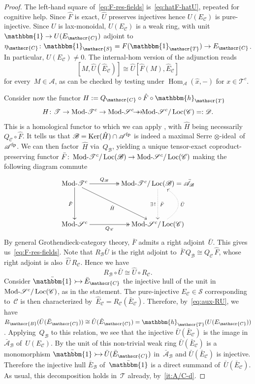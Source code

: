 \documentclass[JEP,XML,SOM,Unicode]{cedram}
\makeatletter
\newcommand{\onto}{\mathchoice{\to\hspace*{-5mm}\to}{\to\hspace*{-2.85mm}\to}{\to\hspace*{-3mm}\to}{\to\hspace*{-3mm}\to}}
\newcommand{\into}{\mathchoice{\xymatrix@=.5cm{\ar@{>->}[r]&}}
{\xymatrix@=.3cm{\ar@{>->}[r]&}\hspace*{-1mm}}
{\hspace*{-1mm}\xymatrix@=.25cm{\ar@{>->}[r]&}\hspace*{-1.5mm}}
{\xymatrix@=.1cm{\ar@{>->}[r]&}\hspace*{-1mm}}
}
\numberwithin{equation}{section}
\theoremstyle{definition}
\DeclareMathOperator{\Hom}{Hom}
\DeclareMathOperator{\Ker}{Ker}
\newcommand{\cat}[1]{\mathscr{#1}}
\newcommand{\Homcat}[1]{\Hom_{\cat #1}}
\newcommand{\unit}{\mathbbm{1}}
\DeclareMathOperator{\Loc}{Loc}
\DeclareMathOperator{\Mod}{Mod}
\newcommand{\AB}{\bar{\cA}_{\cB}}
\newcommand{\bEB}{\bar E_{\cB}}
\newcommand{\bEC}{\bar E_{\cC}}
\newcommand{\bunit}{\bar\unit}
\newcommand{\cA}{\cat{A}}
\newcommand{\cB}{\cat{B}}
\newcommand{\cC}{\cat{C}}
\newcommand{\cD}{\cat{D}}
\newcommand{\cS}{\cat{S}}
\newcommand{\cT}{\cat{T}}
\newcommand{\EC}{E_{\cC}}
\newcommand{\fp}{^{\textup{fp}}}
\newcommand{\hEC}{\hat E_{\cC}}
\newcommand{\Modd}{\Mod\text{\!-}}
\newcommand{\MS}{\Modd\cat S^c}
\newcommand{\MT}{\Modd\cat T^c}
\newcommand{\tensid}{$\otimes$\nobreakdash-ideal}
\newcommand{\yoneda}{\mathbbm{h}}
\makeatother
\begin{document}
\begin{proof}
The left-hand square of~\eqref{eq:F-res-fields} is~\eqref{eq:hatF-hatU}, repeated for cognitive help. Since $\hat F$ is exact, $\hat U$ preserves injectives hence $U(\EC)$ is pure-injective. Since $U$ is lax-monoidal, $U(\EC)$ is a weak ring, with unit~$\unit\to U(\EC)$ adjoint to $\eta_{\cC}\colon \unit_\cS=F(\unit_\cT)\to \EC$. In particular, $U(\EC)\neq 0$. The internal-hom version of the adjunction reads
\begin{equation}
\label{eq:aux-internal-adj}
[M,\hat U(\hEC)]\cong \hat U[\hat F(M),\hEC]
\end{equation}
for every~$M\in\cA$, as can be checked by testing under $\Homcat{A}(\hat x,-)$ for $x\in\cT^c$.

Consider now the functor $H:=Q_{\cC}\circ \hat F\circ\yoneda_\cT$
\[
H\colon \cT\to \MT\to \MS\onto\MS/\Loc(\cC)=:\cD.
\]
This is a homological functor to which we can apply , with $\hat H$ being necessarily~$Q_{\cC}\circ\hat F$. It tells us that $\cB=\Ker(\hat H)\cap\cA\fp$ is indeed a maximal Serre \tensid\ of~$\cA\fp$. We can then factor~$\hat H$ via~$Q_\cB$, yielding a unique tensor-exact coproduct-preserving functor $\bar F\colon \MT/\Loc(\cB)\to \MS/\Loc(\cC)$ making the following diagram commute
\[
\xymatrix@=1.5cm{
\MT \ar[d]_-{\hat F} \ar@{->>}[r]^-{Q_{\cB}} \ar[rd]_-{\hat H}
& \MT/\Loc(\cB)=\AB \ar@{..>}[d]^-{\bar F}_-{\exists\,!}
\\
\MS \ar@{->>}[r]_-{Q_{\cC}}
& \MS/\Loc(\cC) \ar@{..>}@/_3em/[u]_-{\bar U}
}
\]
By general Grothendieck-category theory, $\bar F$ admits a right adjoint~$\bar U$. This gives us~\eqref{eq:F-res-fields}. Note that $R_{\cB}\bar U$ is the right adjoint to~$\bar F\,Q_{\cB}\cong Q_{\cC}\,\hat F$, whose right adjoint is also~$\hat U\,R_{\cC}$. Hence we have
\begin{equation}
\label{eq:aux-RU}
R_{\cB}\circ \bar U \cong \hat U\circ R_{\cC}.
\end{equation}
Consider $\bunit\into \bEC$ the injective hull of the unit in~$\MS/\Loc(\cC)$, as in the statement. The pure-injective $\EC\in\cS$ corresponding to~$\cC$ is then characterized by~$\hEC=R_{\cC}(\bEC)$. Therefore, by~\eqref{eq:aux-RU}, we have $R_{\cB}(\bar U(\bEC))\cong \hat U(\hEC)=\yoneda_{\cT}(U(\EC))$. Applying~$Q_{\cB}$ to this relation, we see that the injective $\bar U(\bEC)$ is the image in~$\AB$ of~$U(\EC)$. By  the unit of this non-trivial weak ring $\bar U(\bEC)$ is a monomorphism $\bunit\into \bar U(\bEC)$ in~$\AB$ and $\bar U(\bEC)$ is injective. Therefore the injective hull $\bEB$ of~$\bunit$ is a direct summand of~$\bar U(\bEC)$. As usual, this decomposition holds in~$\cT$ already, by \,\eqref{it:A/C-d}.
\end{proof}
\end{document}

